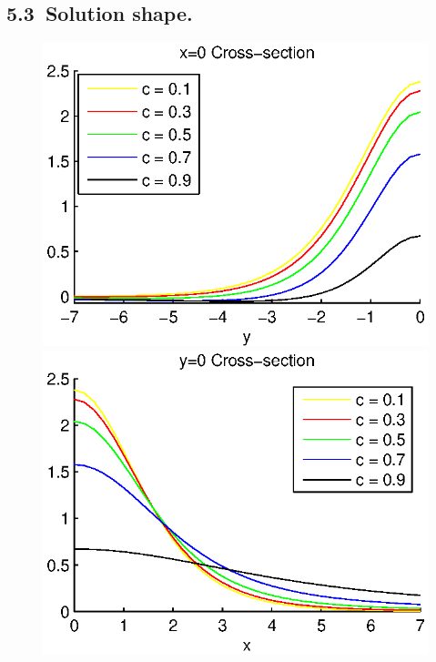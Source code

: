 \documentclass{article}
\begin{document}
\subsection{5.3~Solution shape.}

\begin{figure}[ht]
	\begin{minipage}[b]{0.5\linewidth}
		\raggedleft
		\includegraphics[width=\linewidth]{../EllipticEquationSJC/cross-sections/c=01__09beta=1x=0.eps}
	\end{minipage}	
	\begin{minipage}[b]{0.5\linewidth}
		\raggedright
		 \includegraphics[width=\linewidth]{../EllipticEquationSJC/cross-sections/c=01__09beta=1y=0.eps}

\end{minipage}
\end{figure}
\end{document}
